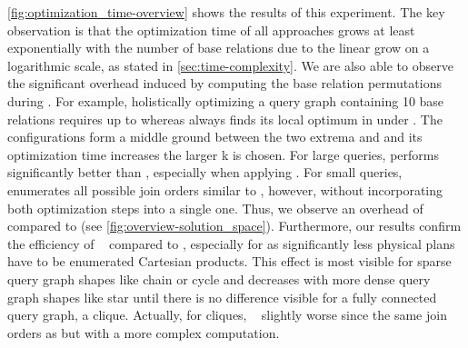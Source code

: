 \autoref{fig:optimization_time-overview} shows the results of this experiment.  The key observation is that the optimization time of all approaches grows at least exponentially with the number of base relations due to the linear grow on a logarithmic scale, as stated in \autoref{sec:time-complexity}.  We are also able to observe the significant overhead induced by computing the base relation permutations during \holistic.  For example, holistically optimizing a query graph containing 10 base relations requires up to  whereas \split always finds its local optimum in under .  The \topk configurations form a middle ground between the two extrema \split and \holistic and its optimization time increases the larger k is chosen.  For large queries, \topk performs significantly better than \holistic, especially when applying \PEall.  For small queries, \topk enumerates all possible join orders similar to \holistic, however, without incorporating both optimization steps into a single one.  Thus, we observe an overhead of \topk compared to \holistic (see \autoref{fig:overview-solution_space}).    Furthermore, our results confirm the efficiency of \DPccp\  compared to \PEall, especially for \holistic as significantly less physical plans have to be enumerated  Cartesian products.  This effect is most visible for sparse query graph shapes like chain or cycle and decreases with more dense query graph shapes like star until there is no difference visible for a fully connected query graph, \ie a clique.  Actually, for cliques, \DPccp\   slightly worse since  the same join orders as \PEall but with a more complex computation.


